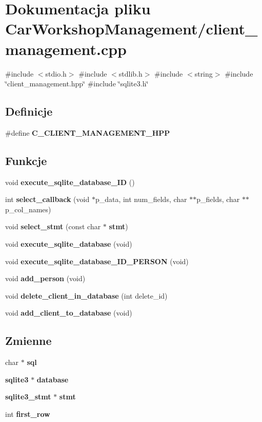 \section{Dokumentacja pliku Car\+Workshop\+Management/client\+\_\+management.cpp}
\label{client__management_8cpp}
{\ttfamily \#include $<$stdio.\+h$>$}\newline
{\ttfamily \#include $<$stdlib.\+h$>$}\newline
{\ttfamily \#include $<$string$>$}\newline
{\ttfamily \#include \char`\"{}client\+\_\+management.\+hpp\char`\"{}}\newline
{\ttfamily \#include \char`\"{}sqlite3.\+h\char`\"{}}\newline
\subsection*{Definicje}
\begin{DoxyCompactItemize}
\item 
\#define \textbf{ C\+\_\+\+C\+L\+I\+E\+N\+T\+\_\+\+M\+A\+N\+A\+G\+E\+M\+E\+N\+T\+\_\+\+H\+PP}
\end{DoxyCompactItemize}
\subsection*{Funkcje}
\begin{DoxyCompactItemize}
\item 
void \textbf{ execute\+\_\+sqlite\+\_\+database\+\_\+\+ID} ()
\item 
int \textbf{ select\+\_\+callback} (void $\ast$p\+\_\+data, int num\+\_\+fields, char $\ast$$\ast$p\+\_\+fields, char $\ast$$\ast$p\+\_\+col\+\_\+names)
\item 
void \textbf{ select\+\_\+stmt} (const char $\ast$\textbf{ stmt})
\item 
void \textbf{ execute\+\_\+sqlite\+\_\+database} (void)
\item 
void \textbf{ execute\+\_\+sqlite\+\_\+database\+\_\+\+I\+D\+\_\+\+P\+E\+R\+S\+ON} (void)
\item 
void \textbf{ add\+\_\+person} (void)
\item 
void \textbf{ delete\+\_\+client\+\_\+in\+\_\+database} (int delete\+\_\+id)
\item 
void \textbf{ add\+\_\+client\+\_\+to\+\_\+database} (void)
\end{DoxyCompactItemize}
\subsection*{Zmienne}
\begin{DoxyCompactItemize}
\item 
char $\ast$ \textbf{ sql}
\item 
\textbf{ sqlite3} $\ast$ \textbf{ database}
\item 
\textbf{ sqlite3\+\_\+stmt} $\ast$ \textbf{ stmt}
\item 
int \textbf{ first\+\_\+row}
\end{DoxyCompactItemize}


